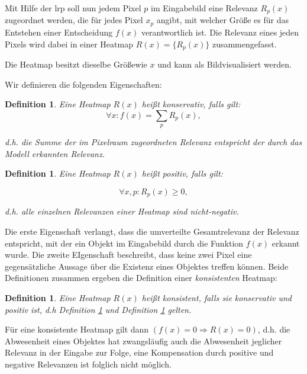 \documentclass[twoside, 12pt,a4paper]{article}
\def\emph#1{\textit{#1}}
\newtheorem{definition}[theorem]{Definition}
\numberwithin{equation}{section}
\begin{document}
	Mit Hilfe der \gls{lrp} soll nun jedem Pixel $p$ im Eingabebild eine Relevanz $R_p(x)$ zugeordnet werden, die für jedes Pixel $x_p$ angibt, mit welcher Größe es für das Entstehen einer Entscheidung $f(x)$ verantwortlich ist. Die Relevanz eines jeden Pixels wird dabei in einer Heatmap $R(x) = \lbrace R_p(x) \rbrace$ zusammengefasst.
	
	Die Heatmap besitzt dieselbe Größewie $x$ und kann als Bildvisualisiert werden.
	
	Wir definieren die folgenden Eigenschaften:
	
	\begin{definition}\label{def_konservativ}
		Eine Heatmap $R(x)$ heißt \emph{konservativ}, falls gilt:
		\begin{equation}
			\forall x: f(x) = \sum_p R_p(x),
		\end{equation}
		
		d.h. die Summe der im Pixelraum zugeordneten Relevanz entspricht der durch das Modell erkannten Relevanz.
	\end{definition}
	
	
	\begin{definition} \label{def_pos}
		Eine Heatmap $R(x)$ heißt \emph{positiv}, falls gilt:
		
		\begin{equation}
			\forall x,p: R_p(x) \geq 0,
		\end{equation}
		
		d.h. alle einzelnen Relevanzen einer Heatmap sind nicht-negativ.
		
	\end{definition}
	
	Die erste Eigenschaft verlangt, dass die umverteilte Gesamtrelevanz der Relevanz entspricht, mit der ein Objekt im Eingabebild durch die Funktion $f(x)$ erkannt wurde.
	Die zweite EIgenschaft beschreibt, dass keine zwei Pixel eine gegensätzliche Aussage über die Existenz eines Objektes treffen können. Beide Definitionen zusammen ergeben die Definition einer \textit{konsistenten} Heatmap:
	
	\begin{definition}
		Eine Heatmap $R(x)$ heißt \emph{konsistent}, falls sie konservativ und positiv ist, d.h Definition \ref{def_konservativ} und Definition \ref{def_pos} gelten.
	\end{definition}

Für eine konsistente Heatmap gilt dann $(f(x) = 0 \Rightarrow R(x) = 0)$, d.h. die Abwesenheit eines Objektes hat zwangsläufig auch die Abwesenheit jeglicher Relevanz in der Eingabe zur Folge, eine Kompensation durch positive und negative Relevanzen ist folglich nicht möglich.
\end{document}
